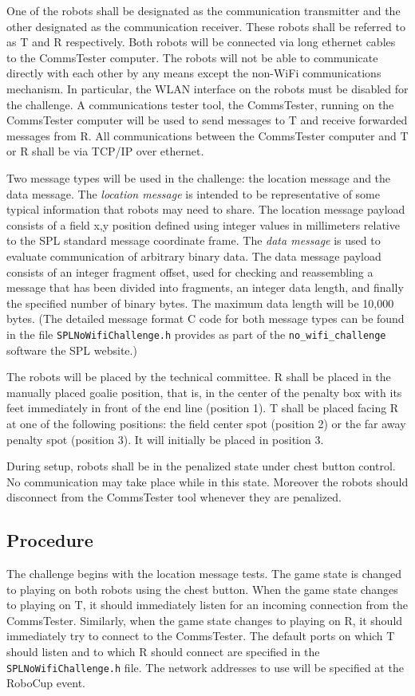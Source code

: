 \documentclass[12pt]{article}
\begin{document}
One of the robots shall be designated as
the communication transmitter and the other designated as the communication receiver. 
These robots shall be referred to as T and R respectively.
Both robots will be connected via long ethernet cables to the CommsTester computer.
The robots will not be able to communicate directly with each other by any means except the non-WiFi communications mechanism. In particular, the WLAN interface on the robots must be disabled for the challenge.
A communications tester tool, the CommsTester, running on the CommsTester computer will be used to send messages to T and receive forwarded messages from R. 
All communications between the CommsTester computer and T or R shall be via TCP/IP over ethernet.

Two message types will be used in the challenge: the location message and the data message. The {\em location message} is intended to be representative of some typical information that robots may need to share. The location message  payload consists of a field x,y position defined using integer values in millimeters relative to the SPL standard message coordinate frame.
The {\em data message} is used to evaluate communication of arbitrary binary data. The data message payload consists of an integer fragment offset, used for checking and reassembling a message that has been divided into fragments, an integer data length, and finally the specified number of binary bytes. The maximum data length will be 10,000 bytes. (The detailed message format C code for both message types can be found in the file 
\texttt{SPLNoWifiChallenge.h} provides as part of the \texttt{no\_wifi\_challenge} software the SPL website.)

The robots will be placed by the technical committee. 
R shall be placed in the manually placed goalie
position, that is, in the center of the penalty box with its feet immediately in front of the end line (position 1).
T shall be placed facing R at one of the following positions: the field center spot (position 2) or the far away penalty spot (position 3). It will initially be placed in position 3.

During setup, robots shall be in the penalized state under chest button control. No communication may take place while in this state. Moreover
the robots should disconnect from the CommsTester tool whenever they are penalized.

\subsection{Procedure}
The challenge begins with the location message tests. The game state is changed to playing on both robots using the chest button. 
When the game state changes to playing on T, it should immediately listen for an incoming connection from the CommsTester.
Similarly, when the game state changes to playing on R, it should immediately try to connect to the CommsTester. The default
ports on which T should listen and to which R should connect are specified in the \texttt{SPLNoWifiChallenge.h} file. The network addresses to use
will be specified at the RoboCup event.
\end{document}
